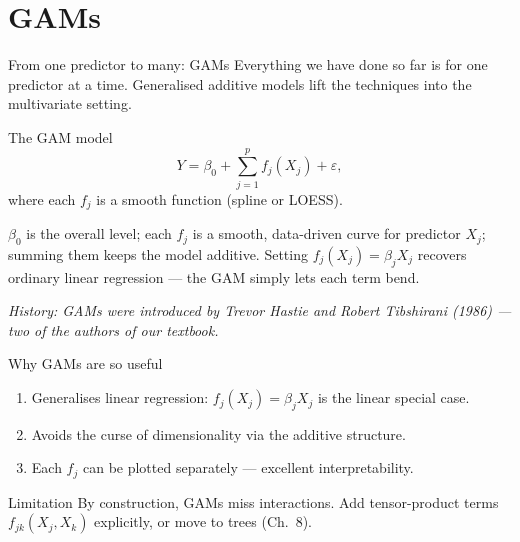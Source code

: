 \documentclass[aspectratio=169,11pt]{beamer}
\begin{document}
\section{GAMs}

\begin{frame}{From one predictor to many: GAMs}\label{frm:gam}
  Everything we have done so far is for one predictor at a time.
  Generalised additive models lift the techniques into the
  multivariate setting.
  \begin{block}{The GAM model}
    \[
      \boxed{\;
        Y = \beta_0 + \sum_{j=1}^p f_j(X_j) + \varepsilon,
      \;}
    \]
    where each $f_j$ is a smooth function (spline or LOESS).
  \end{block}
  \begin{readme}
    $\beta_0$ is the overall level; each $f_j$ is a smooth,
    data-driven curve for predictor $X_j$; summing them keeps the model
    additive. Setting $f_j(X_j)=\beta_j X_j$ recovers ordinary linear
    regression --- the GAM simply lets each term bend.
  \end{readme}
  \par{\tiny\itshape\color{gray}History: GAMs were introduced by Trevor
  Hastie and Robert Tibshirani (1986) --- two of the authors of our
  textbook.}
\end{frame}

\begin{frame}{Why GAMs are so useful}\label{frm:gamwhy}
  \begin{takeaway}
    \begin{enumerate}
      \item Generalises linear regression: $f_j(X_j) = \beta_j X_j$ is
            the linear special case.
      \item Avoids the curse of dimensionality via the additive
            structure.
      \item Each $f_j$ can be plotted separately --- excellent
            interpretability.
    \end{enumerate}
  \end{takeaway}
  \begin{alertblock}{Limitation}
    By construction, GAMs miss interactions. Add tensor-product terms
    $f_{jk}(X_j, X_k)$ explicitly, or move to trees (Ch.~8).
  \end{alertblock}
\end{frame}
\end{document}
